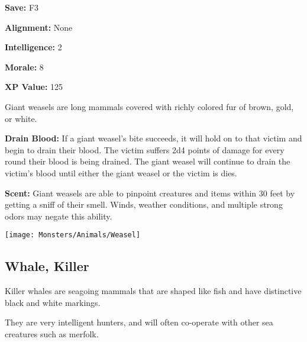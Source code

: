 \begin{multicols*}{2}
{\textbf{Save:} F3

\textbf{Alignment:} None

\textbf{Intelligence:} 2

\textbf{Morale:} 8

\textbf{XP Value:} 125}

Giant weasels are long mammals covered with richly colored fur of brown, gold, or white.

\textbf{Drain Blood:} If a giant weasel’s bite succeeds, it will hold on to that victim and begin to drain their blood. The victim suffers 2d4 points of damage for every round their blood is being drained. The giant weasel will continue to drain the victim's blood until either the giant weasel or the victim is dies.

\textbf{Scent:} Giant weasels are able to pinpoint creatures and items within 30 feet by getting a sniff of their smell. Winds, weather conditions, and multiple strong odors may negate this ability.

\texttt{[image: Monsters/Animals/Weasel]}

\subsection{Whale, Killer}

Killer whales are seagoing mammals that are shaped like fish and have distinctive black and white markings.

They are very intelligent hunters, and will often co-operate with other sea creatures such as merfolk.


\end{multicols*}
